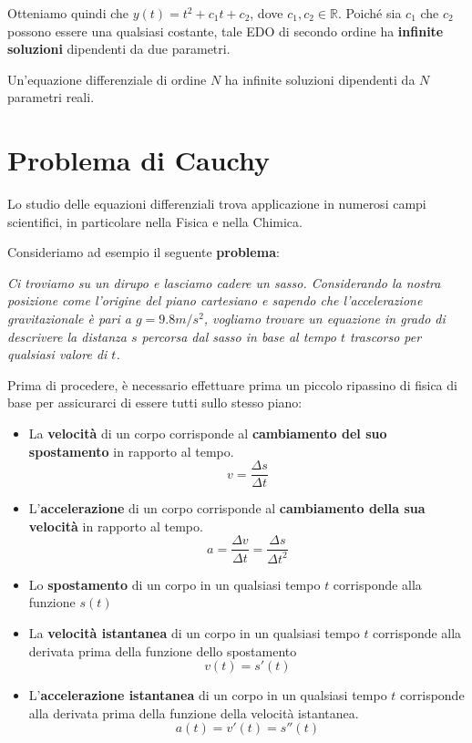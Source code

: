 \documentclass[a4paper, 12pt]{report}
\begin{document}
        Otteniamo quindi che $y(t) = t^2+c_1t+c_2$, dove $c_1, c_2 \in \mathbb{R}$. Poiché sia $c_1$ che $c_2$ possono essere una qualsiasi costante, tale EDO di secondo ordine ha \textbf{infinite soluzioni} dipendenti da due parametri.
        
        \begin{framedprop}{}
        Un'equazione differenziale di ordine $N$ ha infinite soluzioni dipendenti da $N$ parametri reali.
        \end{framedprop}
            
    \newpage
    
    \section{Problema di Cauchy}
    
    Lo studio delle equazioni differenziali trova applicazione in numerosi campi scientifici, in particolare nella Fisica e nella Chimica.
    
    Consideriamo ad esempio il seguente \textbf{problema}:
    
    \textit{Ci troviamo su un dirupo e lasciamo cadere un sasso. Considerando la nostra posizione come l'origine del piano cartesiano e sapendo che l'accelerazione gravitazionale è pari a $g = 9.8 m/s^2$, vogliamo trovare un equazione in grado di descrivere la distanza $s$ percorsa dal sasso in base al tempo $t$ trascorso per qualsiasi valore di $t$.}
    
    Prima di procedere, è necessario effettuare prima un piccolo ripassino di fisica di base per assicurarci di essere tutti sullo stesso piano:
    
    \begin{itemize}
        \item La \textbf{velocità} di un corpo corrisponde al \textbf{cambiamento del suo spostamento} in rapporto al tempo.
        \[ v = \frac{\Delta s}{\Delta t}\]
        
        \item L'\textbf{accelerazione} di un corpo corrisponde al \textbf{cambiamento della sua velocità} in rapporto al tempo.
        \[ a = \frac{\Delta v}{\Delta t} = \frac{\Delta s}{\Delta t^2}\]
        
        \item Lo \textbf{spostamento} di un corpo in un qualsiasi tempo $t$ corrisponde alla funzione $s(t)$
        
        \item La \textbf{velocità istantanea} di un corpo in un qualsiasi tempo $t$ corrisponde alla derivata prima della funzione dello spostamento
        \[ v(t) = s'(t)\]
        
        \item L'\textbf{accelerazione istantanea} di un corpo in un qualsiasi tempo $t$ corrisponde alla derivata prima della funzione della velocità istantanea.
        \[ a(t) = v'(t) = s''(t)\]
    \end{itemize}
    
\end{document}
